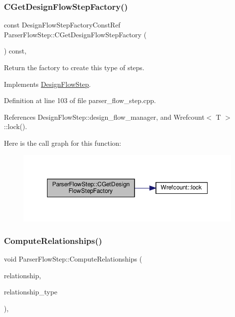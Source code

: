\subsubsection{\texorpdfstring{C\+Get\+Design\+Flow\+Step\+Factory()}{CGetDesignFlowStepFactory()}}
{\footnotesize\ttfamily const Design\+Flow\+Step\+Factory\+Const\+Ref Parser\+Flow\+Step\+::\+C\+Get\+Design\+Flow\+Step\+Factory (\begin{DoxyParamCaption}{ }\end{DoxyParamCaption}) const\hspace{0.3cm}{\ttfamily [override]}, {\ttfamily [virtual]}}



Return the factory to create this type of steps. 



Implements \hyperlink{classDesignFlowStep_a5510a8d296670a07f6b53312c448994c}{Design\+Flow\+Step}.



Definition at line 103 of file parser\+\_\+flow\+\_\+step.\+cpp.



References Design\+Flow\+Step\+::design\+\_\+flow\+\_\+manager, and Wrefcount$<$ T $>$\+::lock().

Here is the call graph for this function\+:
\nopagebreak
\begin{figure}[H]
\begin{center}
\leavevmode
\includegraphics[width=348pt]{dd/d99/classParserFlowStep_a41edd2518ace1ab135ba83ca630540fa_cgraph}
\end{center}
\end{figure}
\mbox{\label{classParserFlowStep_af3cab6d308a30f7d9397d922e34b0a35}} 
\subsubsection{\texorpdfstring{Compute\+Relationships()}{ComputeRelationships()}}
{\footnotesize\ttfamily void Parser\+Flow\+Step\+::\+Compute\+Relationships (\begin{DoxyParamCaption}\item[{\hyperlink{classDesignFlowStepSet}{Design\+Flow\+Step\+Set} \&}]{relationship,  }\item[{const \hyperlink{classDesignFlowStep_a723a3baf19ff2ceb77bc13e099d0b1b7}{Design\+Flow\+Step\+::\+Relationship\+Type}}]{relationship\+\_\+type }\end{DoxyParamCaption})\hspace{0.3cm}{\ttfamily [override]}, {\ttfamily [virtual]}}



